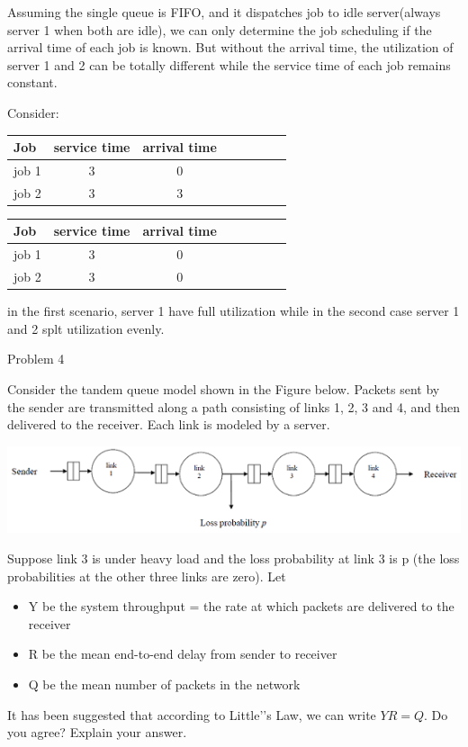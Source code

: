 \documentclass[letterpaper]{article}
\begin{document}
\begin{enumerate}
\begin{enumerate}
Assuming the single queue is FIFO, and it dispatches job to idle server(always server 1 when both are idle), we can only determine the job scheduling if the arrival time of each job is known. But without the arrival time, the utilization of server 1 and 2 can be totally different while the service time of each job remains constant.

Consider:

\begin{tabular}{l*{6}{c}r}
Job              & service time & arrival time \\
\hline
job 1            & 3 & 0 \\
job 2            & 3 & 3 \\
\end{tabular}

\begin{tabular}{l*{6}{c}r}
Job              & service time & arrival time \\
\hline
job 1            & 3 & 0 \\
job 2            & 3 & 0 \\
\end{tabular}

in the first scenario, server 1 have full utilization while in the second case server 1 and 2 splt utilization evenly.

\end{enumerate}
\medskip

\begin{minipage}{\textwidth}
\item{Problem 4}

Consider the tandem queue model shown in the Figure below. Packets sent by the sender are transmitted along a path consisting of links 1, 2, 3 and 4, and then delivered to the receiver. Each link is modeled by a server.

\includegraphics{a1q4.png}
\end{minipage}
Suppose link 3 is under heavy load and the loss probability at link 3 is p (the loss probabilities at the
other three links are zero). Let
\begin{itemize}
\item{} Y be the system throughput = the rate at which packets are delivered to the receiver
\item{} R be the mean end-to-end delay from sender to receiver
\item{} Q be the mean number of packets in the network
\end{itemize}
It has been suggested that according to Little'’s Law, we can write $YR = Q$. Do you agree? Explain your answer.


\end{enumerate}
\end{document}
